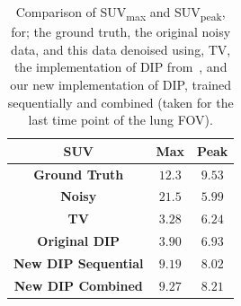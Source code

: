             \begin{table}
                
                \centering
                
                \captionsetup{singlelinecheck=false, justification=centering}
                \caption{
                Comparison of \gls{SUV}\textsubscript{max} and \gls{SUV}\textsubscript{peak}, for; the ground truth, the original noisy data, and this data denoised using, \gls{TV}, the implementation of \gls{DIP} from~\parencite{Gong2019PETPrior}, and our new implementation of \gls{DIP}, trained sequentially and combined (taken for the last time point of the lung \gls{FOV}).}
                
                
                \resizebox*{1.0\linewidth}{!}
                {
                    \begin{tabular}{||c|cc||}
                        \hline
                        \textbf{SUV}                & \textbf{Max}  & \textbf{Peak} \\
                        \hline
                        \textbf{Ground Truth}       & $12.3$        & $9.53$ \\
                        \hline
                        \textbf{Noisy}              & $21.5$        & $5.99$ \\
                        \hline
                        \textbf{TV}                 & $3.28$        & $6.24$ \\
                        \textbf{Original DIP}       & $3.90$        & $6.93$ \\
                        \hline
                        \textbf{New DIP Sequential} & $9.19$        & $8.02$ \\
                        \textbf{New DIP Combined}   & $9.27$        & $8.21$ \\
                        \hline
                    \end{tabular}
                }
                \label{tab:pseudo_bayesian_dip_denoising_as_a_preprocessing_step_for_kinetic_modelling_in_dynamic_pet_appendix_results_suv}
                
            \end{table}
            
